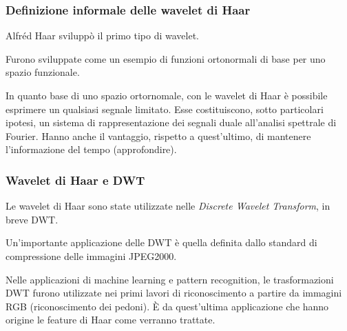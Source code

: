             \subsubsection{Definizione informale delle wavelet di Haar}
                Alfréd Haar sviluppò il primo tipo di wavelet.

                Furono sviluppate come un esempio di funzioni ortonormali di base per uno spazio funzionale.

                In quanto base di uno spazio ortornomale, con le wavelet di Haar è possibile esprimere un qualsiasi segnale limitato.
                Esse costituiscono, sotto particolari ipotesi, un sistema di rappresentazione dei segnali duale all'analisi spettrale di Fourier.
                Hanno anche il vantaggio, rispetto a quest'ultimo, di mantenere l'informazione del tempo (approfondire).

            \subsubsection{Wavelet di Haar e DWT}
                Le wavelet di Haar sono state utilizzate nelle \emph{Discrete Wavelet Transform}, in breve DWT.

                Un'importante applicazione delle DWT è quella definita dallo standard di compressione delle immagini JPEG2000.

                Nelle applicazioni di machine learning e pattern recognition, le trasformazioni DWT furono utilizzate nei primi lavori di riconoscimento a partire da immagini RGB (riconoscimento dei pedoni).
                È da quest'ultima applicazione che hanno origine le feature di Haar come verranno trattate.

